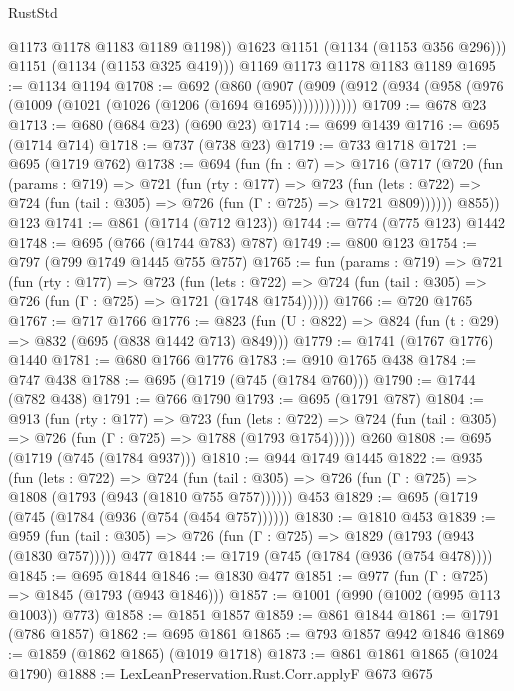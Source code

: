 \begin{lexlean}{RustStd}
\begin{coremodule}
{\begin{coremodule}
{{{{{{{{{            @1173
            @1178
            @1183
            @1189
            @1198))
        @1623
        @1151
        (@1134 (@1153 @356 @296)))
      @1151
      (@1134 (@1153 @325 @419)))
    @1169
    @1173
    @1178
    @1183
    @1189
@1695 := @1134 @1194
@1708 := @692
    (@860 (@907 (@909 (@912 (@934 (@958 (@976 (@1009 (@1021 (@1026 (@1206 (@1694 @1695))))))))))))
@1709 := @678 @23
@1713 := @680 (@684 @23) (@690 @23)
@1714 := @699 @1439
@1716 := @695 (@1714 @714)
@1718 := @737 (@738 @23)
@1719 := @733 @1718
@1721 := @695 (@1719 @762)
@1738 := @694
    (fun (fn : @7) =>
    @1716
      (@717
        (@720
          (fun (params : @719) =>
          @721
            (fun (rty : @177) =>
            @723
              (fun (lets : @722) =>
              @724 (fun (tail : @305) => @726 (fun (Γ : @725) => @1721 @809))))))
        @855))
    @123
@1741 := @861 (@1714 (@712 @123))
@1744 := @774 (@775 @123) @1442
@1748 := @695 (@766 (@1744 @783) @787)
@1749 := @800 @123
@1754 := @797 (@799 @1749 @1445 @755 @757)
@1765 := fun (params : @719) =>
  @721
    (fun (rty : @177) =>
    @723
      (fun (lets : @722) =>
      @724 (fun (tail : @305) => @726 (fun (Γ : @725) => @1721 (@1748 @1754)))))
@1766 := @720 @1765
@1767 := @717 @1766
@1776 := @823 (fun (U : @822) => @824 (fun (t : @29) => @832 (@695 (@838 @1442 @713) @849)))
@1779 := @1741 (@1767 @1776) @1440
@1781 := @680 @1766 @1776
@1783 := @910 @1765 @438
@1784 := @747 @438
@1788 := @695 (@1719 (@745 (@1784 @760)))
@1790 := @1744 (@782 @438)
@1791 := @766 @1790
@1793 := @695 (@1791 @787)
@1804 := @913
    (fun (rty : @177) =>
    @723
      (fun (lets : @722) =>
      @724 (fun (tail : @305) => @726 (fun (Γ : @725) => @1788 (@1793 @1754)))))
    @260
@1808 := @695 (@1719 (@745 (@1784 @937)))
@1810 := @944 @1749 @1445
@1822 := @935
    (fun (lets : @722) =>
    @724 (fun (tail : @305) => @726 (fun (Γ : @725) => @1808 (@1793 (@943 (@1810 @755 @757))))))
    @453
@1829 := @695 (@1719 (@745 (@1784 (@936 (@754 (@454 @757))))))
@1830 := @1810 @453
@1839 := @959 (fun (tail : @305) => @726 (fun (Γ : @725) => @1829 (@1793 (@943 (@1830 @757))))) @477
@1844 := @1719 (@745 (@1784 (@936 (@754 @478))))
@1845 := @695 @1844
@1846 := @1830 @477
@1851 := @977 (fun (Γ : @725) => @1845 (@1793 (@943 @1846)))
@1857 := @1001 (@990 (@1002 (@995 @113 @1003)) @773)
@1858 := @1851 @1857
@1859 := @861 @1844
@1861 := @1791 (@786 @1857)
@1862 := @695 @1861
@1865 := @793 @1857 @942 @1846
@1869 := @1859 (@1862 @1865) (@1019 @1718)
@1873 := @861 @1861 @1865 (@1024 @1790)
@1888 := LexLeanPreservation.Rust.Corr.applyF
    @673
    @675
}}}}}}}}}
\end{coremodule}}
\end{coremodule}
\end{lexlean}
